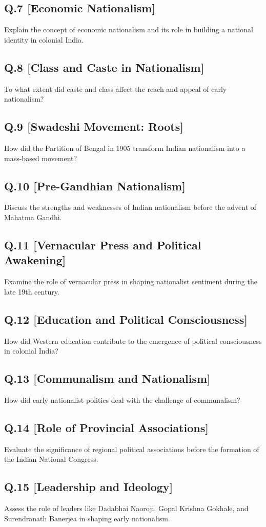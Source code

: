 \subsection*{Q.7 [Economic Nationalism]}
Explain the concept of economic nationalism and its role in building a national identity in colonial India.

\subsection*{Q.8 [Class and Caste in Nationalism]}
To what extent did caste and class affect the reach and appeal of early nationalism?

\subsection*{Q.9 [Swadeshi Movement: Roots]}
How did the Partition of Bengal in 1905 transform Indian nationalism into a mass-based movement?

\subsection*{Q.10 [Pre-Gandhian Nationalism]}
Discuss the strengths and weaknesses of Indian nationalism before the advent of Mahatma Gandhi.

\subsection*{Q.11 [Vernacular Press and Political Awakening]}
Examine the role of vernacular press in shaping nationalist sentiment during the late 19th century.

\subsection*{Q.12 [Education and Political Consciousness]}
How did Western education contribute to the emergence of political consciousness in colonial India?

\subsection*{Q.13 [Communalism and Nationalism]}
How did early nationalist politics deal with the challenge of communalism?

\subsection*{Q.14 [Role of Provincial Associations]}
Evaluate the significance of regional political associations before the formation of the Indian National Congress.

\subsection*{Q.15 [Leadership and Ideology]}
Assess the role of leaders like Dadabhai Naoroji, Gopal Krishna Gokhale, and Surendranath Banerjea in shaping early nationalism.
